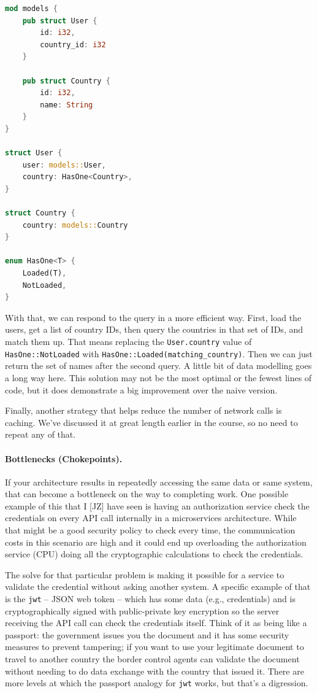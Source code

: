 \begin{lstlisting}[language=Rust]
mod models {
    pub struct User {
        id: i32,
        country_id: i32
    }

    pub struct Country {
        id: i32,
        name: String
    }
}

struct User {
    user: models::User,
    country: HasOne<Country>,
}

struct Country {
    country: models::Country
}

enum HasOne<T> {
    Loaded(T),
    NotLoaded,
}
\end{lstlisting}

With that, we can respond to the query in a more efficient way. First, load the users, get a list of country IDs, then query the countries in that set of IDs, and match them up. That means replacing the \texttt{User.country} value of \texttt{HasOne::NotLoaded} with \texttt{HasOne::Loaded(matching\_country)}. Then we can just return the set of names after the second query. A little bit of data modelling goes a long way here. This solution may not be the most optimal or the fewest lines of code, but it does demonstrate a big improvement over the naive version.


Finally, another strategy that helps reduce the number of network calls is caching. We've discussed it at great length earlier in the course, so no need to repeat any of that.

\paragraph{Bottlenecks (Chokepoints).} 

If your architecture results in repeatedly accessing the same data or same system, that can become a bottleneck on the way to completing work. One possible example of this that I [JZ] have seen is having an authorization service check the credentials on every API call internally in a microservices architecture. While that might be a good security policy to check every time, the communication costs in this scenario are high and it could end up overloading the authorization service (CPU) doing all the cryptographic calculations to check the credentials.

The solve for that particular problem is making it possible for a service to validate the credential without asking another system. A specific example of that is the \texttt{jwt} -- JSON web token -- which has some data (e.g., credentials) and is cryptographically signed with public-private key encryption so the server receiving the API call can check the credentials itself. Think of it as being like a passport: the government issues you the document and it has some security measures to prevent tampering; if you want to use your legitimate document to travel to another country the border control agents can validate the document without needing to do data exchange with the country that issued it. There are more levels at which the passport analogy for \texttt{jwt} works, but that's a digression.

